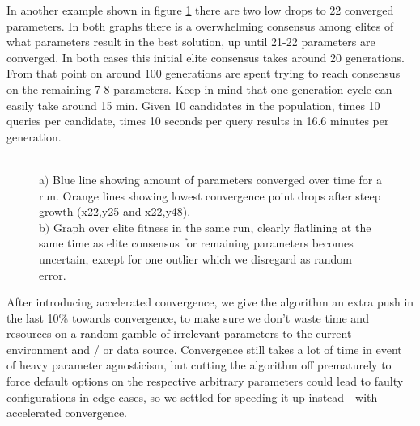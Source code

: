 \documentclass[a4paper,english]{report}
\begin{document}
		\clearpage
		In another example shown in figure \ref{fig:agnos2} there are two low drops to 22 converged parameters. In both graphs there is a overwhelming consensus among elites of what parameters result in the best solution, up until 21-22 parameters are converged. In both cases this initial elite consensus takes around 20 generations. From that point on around 100 generations are spent trying to reach consensus on the remaining 7-8 parameters. Keep in mind that one generation cycle can easily take around 15 min. Given 10 candidates in the population, times 10 queries per candidate, times 10 seconds per query results in 16.6 minutes per generation.
		\begin{figure}[H]
			\centering
			\qquad
			\caption{\\a$)$ Blue line showing amount of parameters converged over time for a run. Orange lines showing lowest convergence point drops after steep growth (x22,y25 and x22,y48).\\b$)$ Graph over elite fitness in the same run, clearly flatlining at the same time as elite consensus for remaining parameters becomes uncertain, except for one outlier which we disregard as random error.}
			\label{fig:agnos2}
		\end{figure}
		After introducing accelerated convergence, we give the algorithm an extra push in the last 10\% towards convergence, to make sure we don't waste time and resources on a random gamble of irrelevant parameters to the current environment and / or data source. Convergence still takes a lot of time in event of heavy parameter agnosticism, but cutting the algorithm off prematurely to force default options on the respective arbitrary parameters could lead to faulty configurations in edge cases, so we settled for speeding it up instead - with accelerated convergence.
		\clearpage
\end{document}
